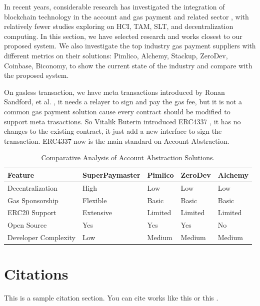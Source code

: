 \documentclass{article}
\begin{document}
In recent years, considerable research has investigated the integration of
blockchain technology in the account and gas payment and related
sector \cite{Sandford2020, Buterin2021, Singh2022}, with relatively fewer studies exploring
on HCI, TAM, SLT, and decentralization computing. In this section, we have
selected research and works closest to our proposed system. We also investigate
the top industry gas payment suppliers with different metrics on their
solutions: Pimlico, Alchemy, Stackup, ZeroDev, Coinbase, Biconomy, to show the
current state of the industry and compare with the proposed system.

On gasless transaction, we have meta transactions introduced by Ronan Sandford,
et al. \cite{Sandford2020}, it needs a relayer to sign and pay the gas fee, but it
is not a common gas payment solution cause every contract should be modified to
support meta trasactions. So Vitalik Buterin introduced ERC4337 \cite{Buterin2021}, it has no
changes to the existing contract, it just add a new interface to sign the
transaction. ERC4337 now is the main standard on Account Abstraction.

\begin{table}[h]
  \centering
  \begin{tabular}{|l|l|l|l|l|}
    \hline
    \textbf{Feature} & \textbf{SuperPaymaster} & \textbf{Pimlico} & \textbf{ZeroDev} & \textbf{Alchemy} \\ \hline
    Decentralization & High & Low & Low & Low \\ \hline
    Gas Sponsorship & Flexible & Basic & Basic & Basic \\ \hline
    ERC20 Support & Extensive & Limited & Limited & Limited \\ \hline
    Open Source & Yes & Yes & Yes & No \\ \hline
    Developer Complexity & Low & Medium & Medium & Medium \\ \hline
  \end{tabular}
  \caption{Comparative Analysis of Account Abstraction Solutions.}
  \label{tab:comparison}
\end{table}

\section{Citations}

This is a sample citation section. You can cite works like this \cite{Krug2005} or this \cite{Sans2024}.

\medskip

\printbibliography
\end{document}
